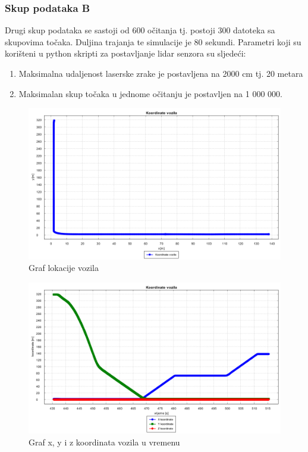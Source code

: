 \subsubsection{Skup podataka B}
Drugi skup podataka se sastoji od 600 očitanja tj. postoji 300 datoteka sa skupovima točaka. Duljina trajanja te simulacije je 80 sekundi. Parametri koji su korišteni u python skripti za postavljanje lidar senzora su sljedeći:
\begin{enumerate}
  \item Maksimalna udaljenost laserske zrake je postavljena na 2000 cm tj. 20 metara
  \item Maksimalan skup točaka u jednome očitanju je postavljen na 1 000 000.
\end{enumerate}
\begin{figure}[H]
  \includegraphics[scale=0.35]{images/koordinate2.png}
  \caption{Graf lokacije vozila}
  \label{fig:gt2_lokacija}
\end{figure}
\begin{figure}[H]
  \includegraphics[scale=0.35]{images/koordinate_vrijeme2.png}
  \caption{Graf x, y i z koordinata vozila u vremenu}
  \label{fig:gt2_lokacija_koord}
\end{figure}
